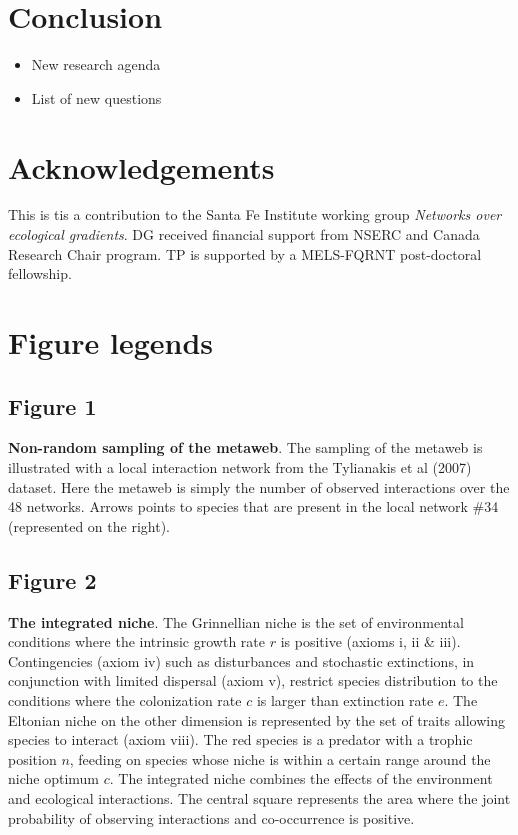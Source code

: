 \documentclass[12pt]{article}
\begin{document}
\newpage
\section*{Conclusion}

\begin{itemize}
\item New research agenda\\

\item List of new questions \\
\end{itemize}

\newpage
\section*{Acknowledgements}
This is tis a contribution to the Santa Fe Institute working group \emph{Networks over
ecological gradients}. DG received financial support from NSERC and Canada
Research Chair program. TP is supported by a MELS-FQRNT post-doctoral
fellowship.
\newpage

\printbibliography

\newpage
\section*{Figure legends}

\subsection*{Figure 1}
\textbf{Non-random sampling of the metaweb}. The sampling of the metaweb is illustrated with a local interaction network from the Tylianakis et al (2007) dataset. Here the metaweb is simply the number of observed interactions over the 48 networks. Arrows points to species that are present in the local network \#34 (represented on the right).  

\subsection*{Figure 2}
\textbf{The integrated niche}.  The Grinnellian niche is the set of environmental conditions
where the intrinsic growth rate $r$ is positive (axioms i, ii \& iii).
Contingencies (axiom iv) such as disturbances and stochastic extinctions, in
conjunction with limited dispersal (axiom v), restrict species distribution to
the conditions where the colonization rate $c$ is larger than extinction rate
$e$. The Eltonian niche on the other dimension is represented by the set of
traits allowing species to interact (axiom viii). The red species is a predator
with a trophic position $n$, feeding on species whose niche is within a certain
range around the niche optimum $c$. The integrated niche combines the effects of
the environment and ecological interactions. The central square represents the
area where the joint probability of observing interactions and co-occurrence is
positive.
\end{document}
